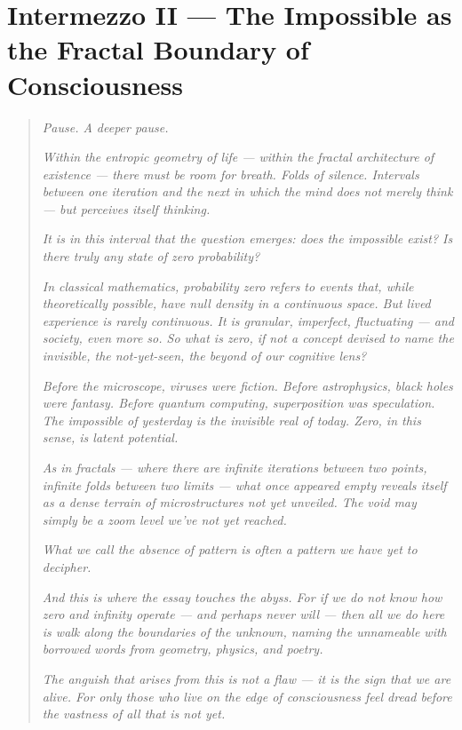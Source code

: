 \section*{Intermezzo II — The Impossible as the Fractal Boundary of Consciousness}

\begin{quote}
\textit{Pause. A deeper pause.}

\textit{Within the entropic geometry of life — within the fractal architecture of existence — there must be room for breath. Folds of silence. Intervals between one iteration and the next in which the mind does not merely think — but perceives itself thinking.}

\textit{It is in this interval that the question emerges: does the impossible exist? Is there truly any state of zero probability?}

\textit{In classical mathematics, probability zero refers to events that, while theoretically possible, have null density in a continuous space. But lived experience is rarely continuous. It is granular, imperfect, fluctuating — and society, even more so. So what is zero, if not a concept devised to name the invisible, the not-yet-seen, the beyond of our cognitive lens?}

\textit{Before the microscope, viruses were fiction. Before astrophysics, black holes were fantasy. Before quantum computing, superposition was speculation. The impossible of yesterday is the invisible real of today. Zero, in this sense, is latent potential.}

\textit{As in fractals — where there are infinite iterations between two points, infinite folds between two limits — what once appeared empty reveals itself as a dense terrain of microstructures not yet unveiled. The void may simply be a zoom level we’ve not yet reached.}

\textit{What we call the absence of pattern is often a pattern we have yet to decipher.}

\textit{And this is where the essay touches the abyss. For if we do not know how zero and infinity operate — and perhaps never will — then all we do here is walk along the boundaries of the unknown, naming the unnameable with borrowed words from geometry, physics, and poetry.}

\textit{The anguish that arises from this is not a flaw — it is the sign that we are alive. For only those who live on the edge of consciousness feel dread before the vastness of all that is not yet.}
\end{quote}
